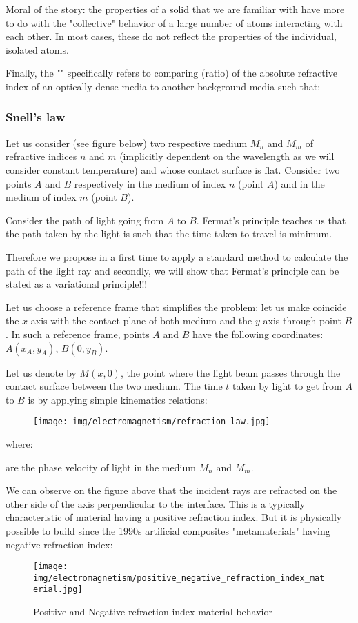 	Moral of the story: the properties of a solid that we are familiar with have more to do with the "collective" behavior of a large number of atoms interacting with each other. In most cases, these do not reflect the properties of the individual, isolated atoms.
	
	Finally, the "" specifically refers to comparing (ratio) of the absolute refractive index of an optically dense media to another background media such that:
	
	
	\pagebreak
	\subsubsection{Snell's law}
	Let us consider (see figure below) two respective medium $M_n$ and $M_m$ of refractive indices $n$ and $m$ (implicitly dependent on the wavelength as we will consider constant temperature) and whose contact surface is flat. Consider two points $A$ and $B$ respectively in the medium of index $n$ (point $A$) and in the medium of index $m$ (point $B$).

	Consider the path of light going from $A$ to $B$. Fermat's principle teaches us that the path taken by the light is such that the time taken to travel is minimum.

	Therefore we propose in a first time to apply a standard method to calculate the path of the light ray and secondly, we will show that Fermat's principle can be stated as a variational principle!!!
	
	Let us choose a reference frame that simplifies the problem: let us make coincide the $x$-axis with the contact plane of both medium and the $y$-axis through point $B$. In such a reference frame, points $A$ and $B$ have the following coordinates: $A(x_A,y_A)$, $B(0,y_B)$.
	
	Let us denote by $M(x,0)$, the point where the light beam passes through the contact surface between the two medium. The time $t$ taken by light to get from $A$ to $B$ is by applying simple kinematics relations:
	
	\begin{figure}[H]
		\centering
		\texttt{[image: img/electromagnetism/refraction\_law.jpg]}
	\end{figure}
	where:
	
	are the phase velocity of light in the medium $M_n$ and $M_m$.
	
	We can observe on the figure above that the incident rays are refracted on the other side of the axis perpendicular to the interface. This is a typically characteristic of material having a positive refraction index. But it is physically possible to build since the 1990s artificial  composites  "metamaterials" having negative refraction  index:
	\begin{figure}[H]
		\centering
		\texttt{[image: img/electromagnetism/positive\_negative\_refraction\_index\_material.jpg]}
		\caption{Positive and Negative refraction index material behavior}
	\end{figure}
	
